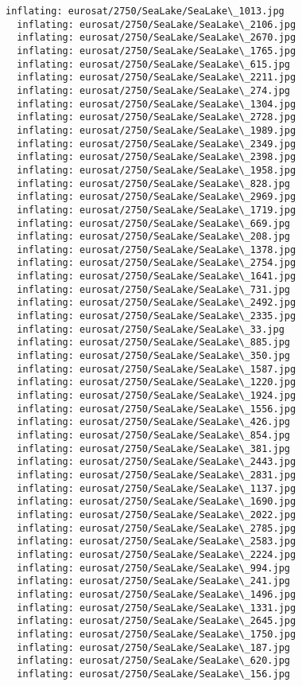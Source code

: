 \documentclass[11pt]{article}
\begin{document}
\begin{Verbatim}[commandchars=\\\{\}]
  inflating: eurosat/2750/SeaLake/SeaLake\_1013.jpg
  inflating: eurosat/2750/SeaLake/SeaLake\_2106.jpg
  inflating: eurosat/2750/SeaLake/SeaLake\_2670.jpg
  inflating: eurosat/2750/SeaLake/SeaLake\_1765.jpg
  inflating: eurosat/2750/SeaLake/SeaLake\_615.jpg
  inflating: eurosat/2750/SeaLake/SeaLake\_2211.jpg
  inflating: eurosat/2750/SeaLake/SeaLake\_274.jpg
  inflating: eurosat/2750/SeaLake/SeaLake\_1304.jpg
  inflating: eurosat/2750/SeaLake/SeaLake\_2728.jpg
  inflating: eurosat/2750/SeaLake/SeaLake\_1989.jpg
  inflating: eurosat/2750/SeaLake/SeaLake\_2349.jpg
  inflating: eurosat/2750/SeaLake/SeaLake\_2398.jpg
  inflating: eurosat/2750/SeaLake/SeaLake\_1958.jpg
  inflating: eurosat/2750/SeaLake/SeaLake\_828.jpg
  inflating: eurosat/2750/SeaLake/SeaLake\_2969.jpg
  inflating: eurosat/2750/SeaLake/SeaLake\_1719.jpg
  inflating: eurosat/2750/SeaLake/SeaLake\_669.jpg
  inflating: eurosat/2750/SeaLake/SeaLake\_208.jpg
  inflating: eurosat/2750/SeaLake/SeaLake\_1378.jpg
  inflating: eurosat/2750/SeaLake/SeaLake\_2754.jpg
  inflating: eurosat/2750/SeaLake/SeaLake\_1641.jpg
  inflating: eurosat/2750/SeaLake/SeaLake\_731.jpg
  inflating: eurosat/2750/SeaLake/SeaLake\_2492.jpg
  inflating: eurosat/2750/SeaLake/SeaLake\_2335.jpg
  inflating: eurosat/2750/SeaLake/SeaLake\_33.jpg
  inflating: eurosat/2750/SeaLake/SeaLake\_885.jpg
  inflating: eurosat/2750/SeaLake/SeaLake\_350.jpg
  inflating: eurosat/2750/SeaLake/SeaLake\_1587.jpg
  inflating: eurosat/2750/SeaLake/SeaLake\_1220.jpg
  inflating: eurosat/2750/SeaLake/SeaLake\_1924.jpg
  inflating: eurosat/2750/SeaLake/SeaLake\_1556.jpg
  inflating: eurosat/2750/SeaLake/SeaLake\_426.jpg
  inflating: eurosat/2750/SeaLake/SeaLake\_854.jpg
  inflating: eurosat/2750/SeaLake/SeaLake\_381.jpg
  inflating: eurosat/2750/SeaLake/SeaLake\_2443.jpg
  inflating: eurosat/2750/SeaLake/SeaLake\_2831.jpg
  inflating: eurosat/2750/SeaLake/SeaLake\_1137.jpg
  inflating: eurosat/2750/SeaLake/SeaLake\_1690.jpg
  inflating: eurosat/2750/SeaLake/SeaLake\_2022.jpg
  inflating: eurosat/2750/SeaLake/SeaLake\_2785.jpg
  inflating: eurosat/2750/SeaLake/SeaLake\_2583.jpg
  inflating: eurosat/2750/SeaLake/SeaLake\_2224.jpg
  inflating: eurosat/2750/SeaLake/SeaLake\_994.jpg
  inflating: eurosat/2750/SeaLake/SeaLake\_241.jpg
  inflating: eurosat/2750/SeaLake/SeaLake\_1496.jpg
  inflating: eurosat/2750/SeaLake/SeaLake\_1331.jpg
  inflating: eurosat/2750/SeaLake/SeaLake\_2645.jpg
  inflating: eurosat/2750/SeaLake/SeaLake\_1750.jpg
  inflating: eurosat/2750/SeaLake/SeaLake\_187.jpg
  inflating: eurosat/2750/SeaLake/SeaLake\_620.jpg
  inflating: eurosat/2750/SeaLake/SeaLake\_156.jpg

\end{Verbatim}
\end{document}
